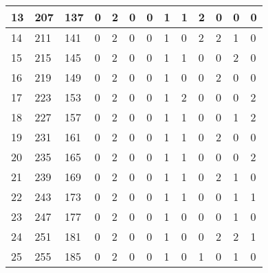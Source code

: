 \begin{sidewaystable}[!h]
\begin{tabular}{|l|l|l|l|l|l|l|l|l|l|l|l|l|}
		13 & 207 & 137 & 0 & 2 & 0 & 0 & 1 & 1 & 2 & 0 & 0 & 0 \\ \hline
		14 & 211 & 141 & 0 & 2 & 0 & 0 & 1 & 0 & 2 & 2 & 1 & 0 \\ \hline
		15 & 215 & 145 & 0 & 2 & 0 & 0 & 1 & 1 & 0 & 0 & 2 & 0 \\ \hline
		16 & 219 & 149 & 0 & 2 & 0 & 0 & 1 & 0 & 0 & 2 & 0 & 0 \\ \hline
		17 & 223 & 153 & 0 & 2 & 0 & 0 & 1 & 2 & 0 & 0 & 0 & 2 \\ \hline
		18 & 227 & 157 & 0 & 2 & 0 & 0 & 1 & 1 & 0 & 0 & 1 & 2 \\ \hline
		19 & 231 & 161 & 0 & 2 & 0 & 0 & 1 & 1 & 0 & 2 & 0 & 0 \\ \hline
		20 & 235 & 165 & 0 & 2 & 0 & 0 & 1 & 1 & 0 & 0 & 0 & 2 \\ \hline
		21 & 239 & 169 & 0 & 2 & 0 & 0 & 1 & 1 & 0 & 2 & 1 & 0 \\ \hline
		22 & 243 & 173 & 0 & 2 & 0 & 0 & 1 & 1 & 0 & 0 & 1 & 1 \\ \hline
		23 & 247 & 177 & 0 & 2 & 0 & 0 & 1 & 0 & 0 & 0 & 1 & 0 \\ \hline
		24 & 251 & 181 & 0 & 2 & 0 & 0 & 1 & 0 & 0 & 2 & 2 & 1 \\ \hline
		25 & 255 & 185 & 0 & 2 & 0 & 0 & 1 & 0 & 1 & 0 & 1 & 0 \\ \hline	
	\end{tabular}
\end{sidewaystable}
\clearpage


